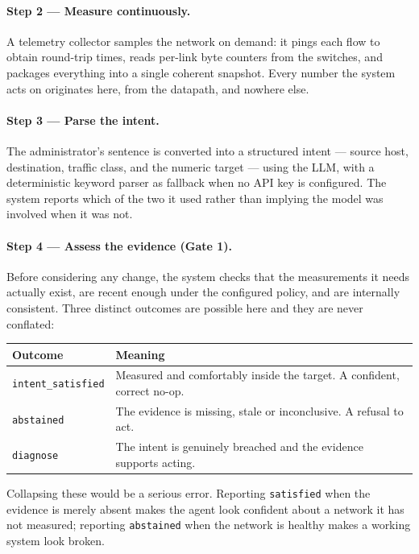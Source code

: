 \documentclass[12pt,a4paper]{report}
\begin{document}
\paragraph{Step 2 --- Measure continuously.}
A telemetry collector samples the network on demand: it pings each flow to
obtain round-trip times, reads per-link byte counters from the switches, and
packages everything into a single coherent snapshot. Every number the system
acts on originates here, from the datapath, and nowhere else.

\paragraph{Step 3 --- Parse the intent.}
The administrator's sentence is converted into a structured intent --- source
host, destination, traffic class, and the numeric target --- using the LLM, with
a deterministic keyword parser as fallback when no API key is configured. The
system reports which of the two it used rather than implying the model was
involved when it was not.

\paragraph{Step 4 --- Assess the evidence (Gate 1).}
Before considering any change, the system checks that the measurements it needs
actually exist, are recent enough under the configured policy, and are
internally consistent. Three distinct outcomes are possible here and they are
never conflated:

\begin{center}
\begin{tabular}{@{}L{3.4cm}L{9.1cm}@{}}
\toprule
\textbf{Outcome} & \textbf{Meaning} \\
\midrule
\texttt{intent\_satisfied}
  & Measured and comfortably inside the target. A confident, correct no-op. \\
\texttt{abstained}
  & The evidence is missing, stale or inconclusive. A refusal to act. \\
\texttt{diagnose}
  & The intent is genuinely breached and the evidence supports acting. \\
\bottomrule
\end{tabular}
\end{center}

Collapsing these would be a serious error. Reporting \texttt{satisfied} when the
evidence is merely absent makes the agent look confident about a network it has
not measured; reporting \texttt{abstained} when the network is healthy makes a
working system look broken.
\end{document}
